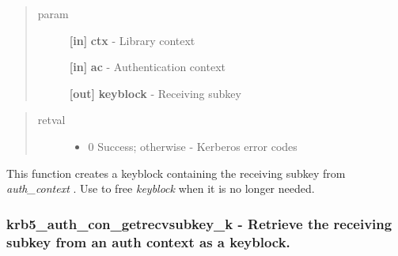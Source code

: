 \documentclass[letterpaper,10pt,english]{sphinxmanual}
\begin{document}
\begin{quote}\begin{description}
\item[{param}] \leavevmode
\textbf{{[}in{]}} \textbf{ctx} - Library context

\textbf{{[}in{]}} \textbf{ac} - Authentication context

\textbf{{[}out{]}} \textbf{keyblock} - Receiving subkey

\end{description}\end{quote}
\begin{quote}\begin{description}
\item[{retval}] \leavevmode\begin{itemize}
\item {} 
0   Success; otherwise - Kerberos error codes

\end{itemize}

\end{description}\end{quote}

This function creates a keyblock containing the receiving subkey from \emph{auth\_context} . Use {\hyperref[appdev/refs/api/krb5_free_keyblock:krb5_free_keyblock]{}} to free \emph{keyblock} when it is no longer needed.


\subsubsection{krb5\_auth\_con\_getrecvsubkey\_k -  Retrieve the receiving subkey from an auth context as a keyblock.}
\label{appdev/refs/api/krb5_auth_con_getrecvsubkey_k:krb5-auth-con-getrecvsubkey-k-retrieve-the-receiving-subkey-from-an-auth-context-as-a-keyblock}\label{appdev/refs/api/krb5_auth_con_getrecvsubkey_k::doc}

\begin{fulllineitems}
\label{appdev/refs/api/krb5_auth_con_getrecvsubkey_k:krb5_auth_con_getrecvsubkey_k}
\end{fulllineitems}
\end{document}
